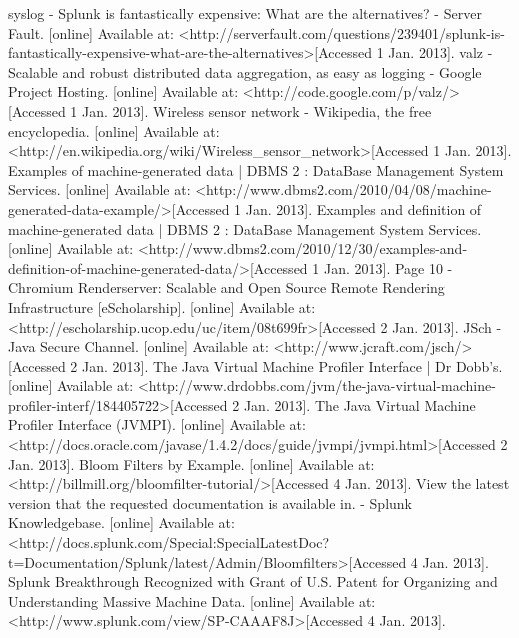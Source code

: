 \documentclass{llncs}
\begin{document}
\begin{thebibliography}{}
 syslog - Splunk is fantastically expensive: What are the alternatives? - Server Fault. [online] Available at: \textless http://serverfault.com/questions/239401/splunk-is-fantastically-expensive-what-are-the-alternatives\textgreater [Accessed 1 Jan. 2013].
 valz - Scalable and robust distributed data aggregation, as easy as logging - Google Project Hosting. [online] Available at: \textless http://code.google.com/p/valz/\textgreater [Accessed 1 Jan. 2013].
Wireless sensor network - Wikipedia, the free encyclopedia. [online] Available at: \textless http://en.wikipedia.org/wiki/Wireless\_sensor\_network\textgreater [Accessed 1 Jan. 2013].
 Examples of machine-generated data | DBMS 2 : DataBase Management System Services. [online] Available at: \textless http://www.dbms2.com/2010/04/08/machine-generated-data-example/\textgreater [Accessed 1 Jan. 2013].
 Examples and definition of machine-generated data | DBMS 2 : DataBase Management System Services. [online] Available at: \textless http://www.dbms2.com/2010/12/30/examples-and-definition-of-machine-generated-data/\textgreater [Accessed 1 Jan. 2013].
 Page 10 - Chromium Renderserver: Scalable and Open Source Remote Rendering Infrastructure [eScholarship]. [online] Available at: \textless http://escholarship.ucop.edu/uc/item/08t699fr\textgreater [Accessed 2 Jan. 2013].
 JSch - Java Secure Channel. [online] Available at: \textless http://www.jcraft.com/jsch/\textgreater [Accessed 2 Jan. 2013].
 The Java Virtual Machine Profiler Interface | Dr Dobb’s. [online] Available at: \textless http://www.drdobbs.com/jvm/the-java-virtual-machine-profiler-interf/184405722\textgreater [Accessed 2 Jan. 2013].
 The Java Virtual Machine Profiler Interface (JVMPI). [online] Available at: \textless http://docs.oracle.com/javase/1.4.2/docs/guide/jvmpi/jvmpi.html\textgreater [Accessed 2 Jan. 2013].
 Bloom Filters by Example. [online] Available at: \textless http://billmill.org/bloomfilter-tutorial/\textgreater [Accessed 4 Jan. 2013].
 View the latest version that the requested documentation is available in. - Splunk Knowledgebase. [online] Available at:
\textless http://docs.splunk.com/Special:SpecialLatestDoc?t=Documentation/Splunk/latest/Admin/Bloomfilters\textgreater [Accessed 4 Jan. 2013].
 Splunk Breakthrough Recognized with Grant of U.S. Patent for Organizing and Understanding Massive Machine Data. [online] Available at: \textless http://www.splunk.com/view/SP-CAAAF8J\textgreater [Accessed 4 Jan. 2013].

\end{thebibliography}
\end{document}
